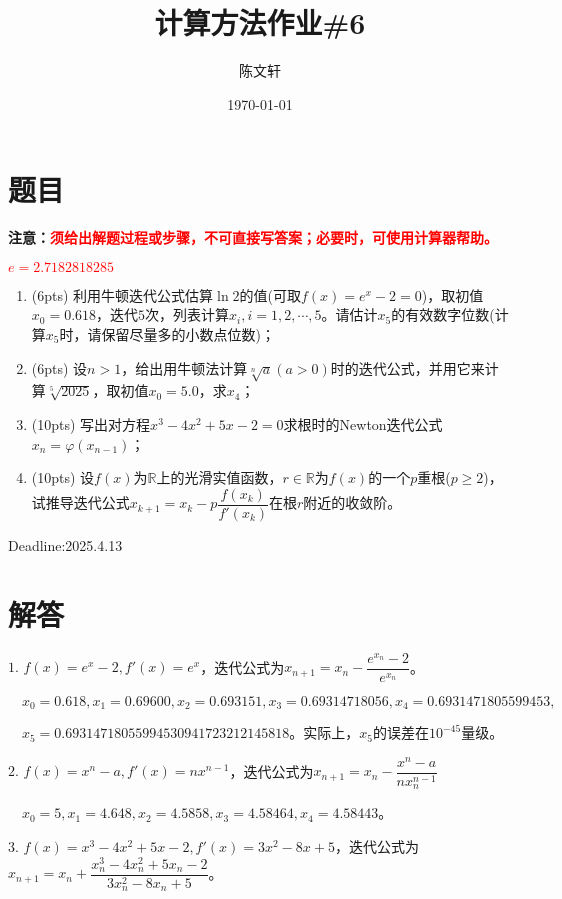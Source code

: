 \documentclass[cn,hazy,green,11pt,normal]{elegantnote}
\title{计算方法作业\#6}
\author{陈文轩}
\institute{KFRC}
\date{\today}
\begin{document}
\maketitle

\section{题目}

    \textbf{注意：\textcolor{red}{须给出解题过程或步骤，不可直接写答案；必要时，可使用计算器帮助。}}

    \textcolor{red}{$e=2.7182818285$}
    \begin{enumerate}
        \item (6pts) 利用牛顿迭代公式估算$\ln 2$的值(可取$f(x)=e^x-2=0$)，取初值$x_0=0.618$，迭代$5$次，列表计算$x_i,i=1,2,\cdots,5$。请估计$x_5$的有效数字位数(计算$x_5$时，请保留尽量多的小数点位数)；
        \item (6pts) 设$n>1$，给出用牛顿法计算$\sqrt[n]{a}(a>0)$时的迭代公式，并用它来计算$\sqrt[5]{2025}$，取初值$x_0=5.0$，求$x_4$；
        \item (10pts) 写出对方程$x^3-4x^2+5x-2=0$求根时的Newton迭代公式$x_n=\varphi(x_{n-1})$；
        \item (10pts) 设$f(x)$为$\mathbb{R}$上的光滑实值函数，$r\in\mathbb{R}$为$f(x)$的一个$p$重根($p\geq2$)，试推导迭代公式$x_{k+1}=x_k-p\dfrac{f(x_k)}{f'(x_k)}$在根$r$附近的收敛阶。
    \end{enumerate}

    Deadline:2025.4.13

\section{解答}

    $1.\,\,f(x)=e^x-2,f'(x)=e^x$，迭代公式为$x_{n+1}=x_n-\dfrac{e^{x_n}-2}{e^{x_n}}$。

    $\quad x_0=0.618,x_1=0.69600,x_2=0.693151,x_3=0.69314718056,x_4=0.6931471805599453,$

    $\quad x_5=0.69314718055994530941723212145818$。实际上，$x_5$的误差在$10^{-45}$量级。

    $2.\,\,f(x)=x^n-a,f'(x)=nx^{n-1}$，迭代公式为$x_{n+1}=x_n-\dfrac{x^n-a}{nx_n^{n-1}}$

    $\quad x_0=5,x_1=4.648,x_2=4.5858,x_3=4.58464,x_4=4.58443$。

    $3.\,\,f(x)=x^3-4x^2+5x-2,f'(x)=3x^2-8x+5$，迭代公式为$x_{n+1}=x_n+\dfrac{x_n^3-4x_n^2+5x_n-2}{3x_n^2-8x_n+5}$。
\end{document}
